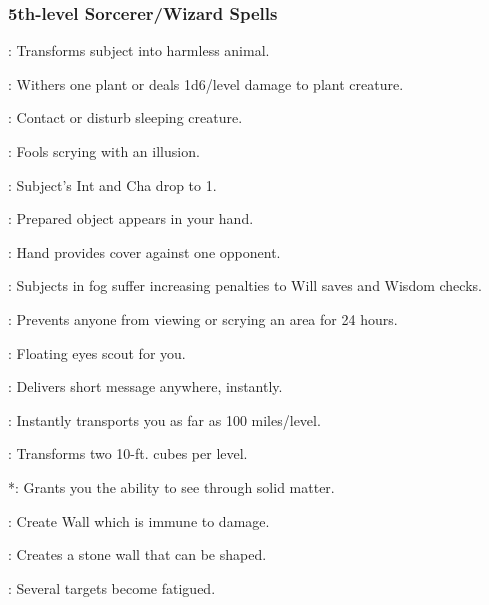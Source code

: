 \subsubsection{5th-level Sorcerer/Wizard Spells}
\begin{list}{}{\leftmargin=1em} 
\item {}: Transforms subject into harmless animal.
\item {}: Withers one plant or deals 1d6/level damage to plant creature.
\item {}: Contact or disturb sleeping creature.
\item {}: Fools scrying with an illusion.
\item {}: Subject's Int and Cha drop to 1.
\item {}: Prepared object appears in your hand.
\item {}: Hand provides cover against one opponent.
\item {}: Subjects in fog suffer increasing penalties to Will saves and Wisdom checks.
\item {}: Prevents anyone from viewing or scrying an area for 24 hours.
\item {}: Floating eyes scout for you.
\item {}: Delivers short message anywhere, instantly.
\item {}: Instantly transports you as far as 100 miles/level.
\item {}: Transforms two 10-ft. cubes per level.
\item {}*: Grants you the ability to see through solid matter.
\item {}: Create Wall which is immune to damage.
\item {}: Creates a stone wall that can be shaped.
\item {}: Several targets become fatigued.
\end{list}
